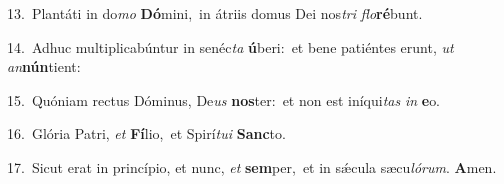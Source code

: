{\numbfont\textcolor{\numbcolor}{13.}}~Plantáti in do\textit{mo} \textbf{Dó}\-mini,~\star in átriis domus Dei nos\textit{tri} \textit{flo}\-\textbf{ré}bunt.\par
{\numbfont\textcolor{\numbcolor}{14.}}~Adhuc multiplicabúntur in senéc\textit{ta} \textbf{ú}\-beri:~\star et bene patiéntes erunt, \textit{ut} \textit{an}\-\textbf{nún}tient:\par
{\numbfont\textcolor{\numbcolor}{15.}}~Quóniam rectus Dóminus, De\textit{us} \textbf{nos}\-ter:~\star et non est iníqui\textit{tas} \textit{in} \textbf{e}\-o.\par
{\numbfont\textcolor{\numbcolor}{16.}}~Glória Patri, \textit{et} \textbf{Fí}\-lio,~\star et Spirí\-\textit{tu}\-\textit{i} \textbf{Sanc}\-to.\par
{\numbfont\textcolor{\numbcolor}{17.}}~Sicut erat in princípio, et nunc, \textit{et} \textbf{sem}\-per,~\star et in sǽcula sæcu\-\textit{ló}\-\textit{rum}. \textbf{A}\-men.\par
